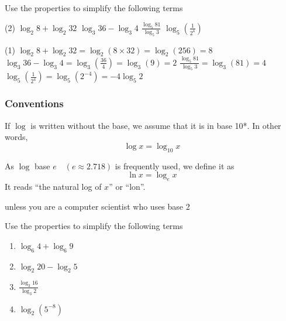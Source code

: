 \begin{frame}[t]
  \begin{ex}
    Use the properties to simplify the following terms
    \begin{tasks}(2)
      \task $\log_2 8 + \log_2 32$
      \task $\log_3 36 - \log_3 4$
      \task $\frac{\log_5 81}{\log_5 3}$
      \task $\log_5 \left(\frac{1}{2^4} \right)$
    \end{tasks}
  \end{ex}
  \begin{sol}
    \begin{tasks}(1)
      \task $\log_2 8 + \log_2 32 = \log_2 (8 \times 32) = \log_2 (256) = 8$
      \task $\log_3 36 - \log_3 4 = \log_3 \left( \frac{36}{4} \right) = \log_3 (9) = 2$
      \task $\frac{\log_5 81}{\log_5 3} = \log_{3} (81) = 4$
      \task $\log_5 \left(\frac{1}{2^4} \right) = \log_5 (2^{-4}) = -4 \log_5 2$
    \end{tasks}
  \end{sol}
\end{frame}

\begin{frame}
  \frametitle{Conventions}
  \begin{defn}{}{}
    If $\log$ is written without the base, we assume that it is in base 10*. In other words,
    \[\log x = \log_{10} x\]
  \end{defn}

  \begin{defn}{}{}
    As $\log$ base $e \quad (e \approx 2.718)$ is frequently used, we define it as
    \[\ln x = \log_e x \]
    It reads ``the natural log of $x$'' or ``lon''.
  \end{defn}
  {\small *unless you are a computer scientist who uses base 2}
\end{frame}

\begin{frame}
  \begin{exercisebox}{}{}
    Use the properties to simplify the following terms
    \begin{enumerate}
      \item $\log_6 4 + \log_6 9$
      \item $\log_2 20 - \log_2 5$
      \item $\frac{\log_3 16}{\log_3 2}$
      \item $\log_2 (5^{-8})$
    \end{enumerate}
  \end{exercisebox}
\end{frame}

